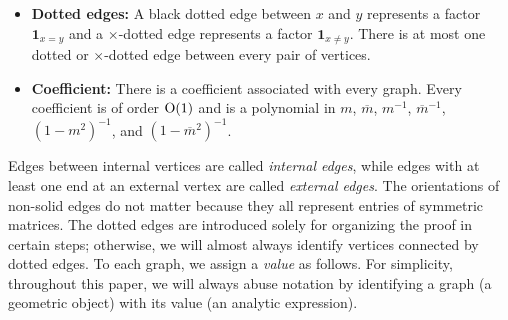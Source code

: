 \begin{definition}[Graphs]
\begin{itemize}
\begin{itemize}
\item A blue (resp.~red) waved edge between $x$ and $y$ represents an $S^+_{xy}$ (resp.~$S^-_{xy}$) factor.
\end{itemize}

\item {\bf Dotted edges:} A black dotted edge between $x$ and $y$ represents a factor $\mathbf 1_{x=y}$ and a $\times$-dotted edge represents a factor $\mathbf 1_{x\ne y}$. There is at most one dotted or $\times$-dotted edge between every pair of vertices.
  
		
\item{\bf Coefficient:} There is a coefficient associated with every graph. Every coefficient is of order $\operatorname{O}(1)$ and is a polynomial in $m$, $\overline m$, $m^{-1}$, $\overline m^{-1}$, $(1-m^2)^{-1}$, and $(1-\overline m^2)^{-1}$. 

\end{itemize}	
\end{definition}



Edges between internal vertices are called \emph{internal edges}, while edges with at least one end at an external vertex are called \emph{external edges}. The orientations of non-solid edges do not matter because they all represent entries of symmetric matrices. %
The dotted edges are introduced solely for organizing the proof in certain steps; otherwise, we will almost always identify vertices connected by dotted edges. 
To each graph, we assign a \emph{value} as follows. For simplicity, throughout this paper, we will always abuse notation by identifying a graph (a geometric object) with its value (an analytic expression). 

